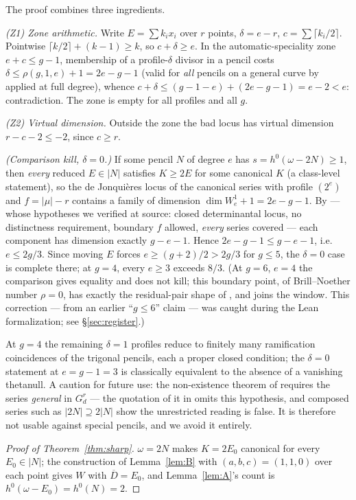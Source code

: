\documentclass[11pt]{article}
\newcommand{\Dbar}{\overline{D}}
\begin{document}
The proof combines three ingredients.

\emph{(Z1) Zone arithmetic.}  Write $E=\sum k_ix_i$ over $r$ points,
$\delta=e-r$, $c=\sum\lceil k_i/2\rceil$.  Pointwise
$\lceil k/2\rceil+(k-1)\ge k$, so $c+\delta\ge e$.  In the automatic-speciality
zone $e+c\le g-1$, membership of a profile-$\delta$ divisor in a pencil costs
$\delta\le\rho(g,1,e)+1=2e-g-1$ (valid for \emph{all} pencils on a general curve by
\cite[Thm.~1.1]{farkas} applied at full degree), whence
$c+\delta\le(g-1-e)+(2e-g-1)=e-2<e$: contradiction.  The zone is empty for all
profiles and all $g$.

\emph{(Z2) Virtual dimension.}  Outside the zone the bad locus has virtual
dimension $r-c-2\le-2$, since $c\ge r$.

\emph{(Comparison kill, $\delta=0$.)}  If some pencil $N$ of degree $e$ has
$s=h^0(\omega-2N)\ge1$, then \emph{every} reduced $E\in|N|$ satisfies
$K\ge2E$ for some canonical $K$ (a class-level statement), so the de Jonqui\`eres
locus of the canonical series with profile $(2^e)$ and $f=|\mu|-r$ contains a
family of dimension $\dim W^1_e+1=2e-g-1$.  By \cite[Thm.~1.1]{farkas} --- whose
hypotheses we verified at source: closed determinantal locus, no distinctness
requirement, boundary $f$ allowed, \emph{every} series covered --- each component
has dimension exactly $g-e-1$.  Hence $2e-g-1\le g-e-1$, i.e.\ $e\le 2g/3$.  Since
moving $E$ forces $e\ge(g+2)/2>2g/3$ for $g\le5$, the $\delta=0$ case is complete
there; at $g=4$, every $e\ge3$ exceeds $8/3$.  (At $g=6$, $e=4$ the comparison
gives equality and does not kill; this boundary point, of Brill--Noether number
$\rho=0$, has exactly the residual-pair shape of \cite[Thm.~1.1]{ungureanuSec},
and joins the window.  This correction --- from an earlier ``$g\le6$'' claim ---
was caught during the Lean formalization; see \S\ref{sec:register}.)

At $g=4$ the remaining $\delta=1$ profiles reduce to finitely many ramification
coincidences of the trigonal pencils, each a proper closed condition; the
$\delta=0$ statement at $e=g-1=3$ is classically equivalent to the absence of a
vanishing thetanull.  A caution for future use: the non-existence theorem of
\cite[Thm.~1.5]{ungureanuDim} requires the series \emph{general} in $G^r_d$ ---
the quotation of it in \cite{farkas} omits this hypothesis, and composed series
such as $|2N|\supseteq 2|N|$ show the unrestricted reading is false.  It is
therefore not usable against special pencils, and we avoid it entirely.

\begin{proof}[Proof of Theorem~\ref{thm:sharp}]
$\omega=2N$ makes $K=2E_0$ canonical for every $E_0\in|N|$; the construction of
Lemma~\ref{lem:B} with $(a,b,c)=(1,1,0)$ over each point gives $W$ with
$\Dbar=E_0$, and Lemma~\ref{lem:A}'s count is
$h^0(\omega-E_0)=h^0(N)=2$.
\end{proof}
\end{document}

